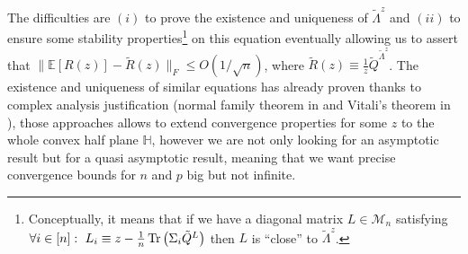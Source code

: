 \documentclass[a4papaer, titlepage]{book}
\begin{document}

 The difficulties are $(i)$ to prove the existence and uniqueness of $\tilde \Lambda^z$ and $(ii)$ to ensure some stability properties\footnote{Conceptually, it means that if we have a diagonal matrix $L \in \mathcal M_{n}$ satisfying $\forall i\in [n]  : \ L_i \equiv z - \frac{1}{n} \operatorname{Tr} \left(\Sigma_i \tilde Q^{L}\right)$ then $L$ is ``close'' to $\tilde \Lambda^z$.} on this equation eventually allowing us to assert that $\|\mathbb E[R(z)] - \tilde R(z)\|_F \leq O( 1/ \sqrt n)$, where $\tilde R(z) \equiv \frac{1}{z}\tilde Q^{\tilde \Lambda^z}$.
 The existence and uniqueness of similar equations has already proven thanks to complex analysis justification (normal family theorem in \cite{hachem2007deterministic} and Vitali's theorem in \cite{wagner2012large,yin2020singular}), those approaches allows to extend convergence properties for some $z$ to the whole convex half plane $\mathbb H$, however we are not only looking for an asymptotic result but for a quasi asymptotic result, meaning that we want precise convergence bounds for $n$ and $p$ big but not infinite.
\end{document}
